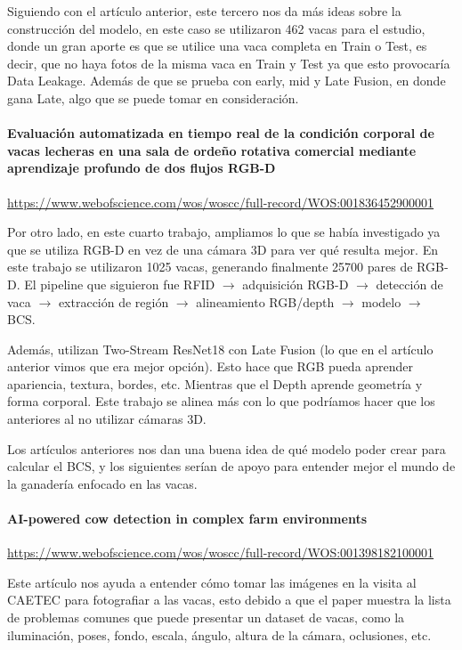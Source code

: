 Siguiendo con el artículo anterior, este tercero nos da más ideas sobre la construcción del modelo, en este caso se utilizaron 462 vacas para el estudio, donde un gran aporte es que se utilice una vaca completa en Train o Test, es decir, que no haya fotos de la misma vaca en Train y Test ya que esto provocaría Data Leakage. Además de que se prueba con early, mid y Late Fusion, en donde gana Late, algo que se puede tomar en consideración.

\paragraph{Evaluación automatizada en tiempo real de la condición corporal de vacas lecheras en una sala de ordeño rotativa comercial mediante aprendizaje profundo de dos flujos RGB-D}

\url{https://www.webofscience.com/wos/woscc/full-record/WOS:001836452900001}

Por otro lado, en este cuarto trabajo, ampliamos lo que se había investigado ya que se utiliza RGB-D en vez de una cámara 3D para ver qué resulta mejor. En este trabajo se utilizaron 1025 vacas, generando finalmente 25700 pares de RGB-D. El pipeline que siguieron fue RFID $\rightarrow$ adquisición RGB-D $\rightarrow$ detección de vaca $\rightarrow$ extracción de región $\rightarrow$ alineamiento RGB/depth $\rightarrow$ modelo $\rightarrow$ BCS.

Además, utilizan Two-Stream ResNet18 con Late Fusion (lo que en el artículo anterior vimos que era mejor opción). Esto hace que RGB pueda aprender apariencia, textura, bordes, etc. Mientras que el Depth aprende geometría y forma corporal. Este trabajo se alinea más con lo que podríamos hacer que los anteriores al no utilizar cámaras 3D.

Los artículos anteriores nos dan una buena idea de qué modelo poder crear para calcular el BCS, y los siguientes serían de apoyo para entender mejor el mundo de la ganadería enfocado en las vacas.

\paragraph{AI-powered cow detection in complex farm environments}

\url{https://www.webofscience.com/wos/woscc/full-record/WOS:001398182100001}

Este artículo nos ayuda a entender cómo tomar las imágenes en la visita al CAETEC para fotografiar a las vacas, esto debido a que el paper muestra la lista de problemas comunes que puede presentar un dataset de vacas, como la iluminación, poses, fondo, escala, ángulo, altura de la cámara, oclusiones, etc.

